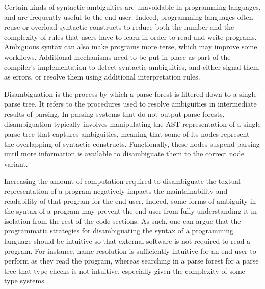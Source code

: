 Certain kinds of syntactic ambiguities are unavoidable in programming languages, and are frequently useful to the end user.
Indeed, programming languages often reuse or overload syntactic constructs to reduce both the number and the complexity of rules that users have to learn in order to read and write programs.
Ambiguous syntax can also make programs more terse, which may improve some workflows.
Additional mechanisms need to be put in place as part of the compiler's implementation to detect syntactic ambiguities, and either signal them as errors, or resolve them using additional interpretation rules.


Disambiguation is the process by which a parse forest is filtered down to a single parse tree.
It refers to the procedures used to resolve ambiguities in intermediate results of parsing.
In parsing systems that do not output parse forests, disambiguation typically involves manipulating the \ac{AST} representation of a single parse tree that captures ambiguities, meaning that some of its nodes represent the overlapping of syntactic constructs.
Functionally, these nodes suspend parsing until more information is available to disambiguate them to the correct node variant.


Increasing the amount of computation required to disambiguate the textual representation of a program negatively impacts the maintainability and readability of that program for the end user.
Indeed, some forms of ambiguity in the syntax of a program may prevent the end user from fully understanding it in isolation from the rest of the code sections.
As such, one can argue that the programmatic strategies for disambiguating the syntax of a programming language should be intuitive so that external software is not required to read a program.
For instance, name resolution is sufficiently intuitive for an end user to perform as they read the program, whereas searching in a parse forest for a parse tree that type-checks is not intuitive, especially given the complexity of some type systems.


